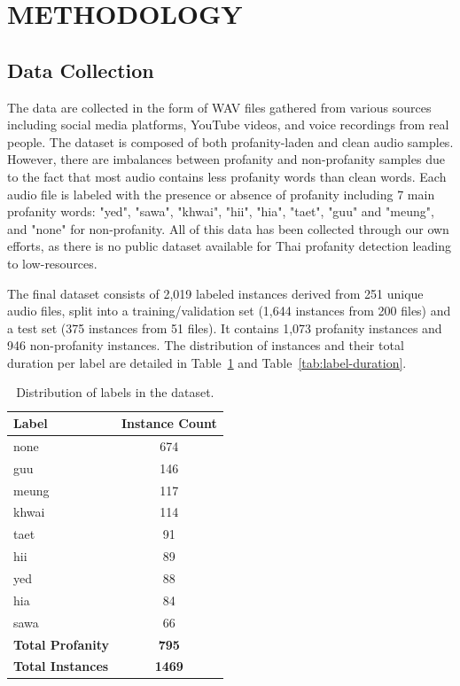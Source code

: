 \documentclass[11pt]{article}
\begin{document}
\section{METHODOLOGY}
\subsection{Data Collection}
The data are collected in the form of WAV files gathered from various sources including 
social media platforms, YouTube videos, and voice recordings from real people.
The dataset is composed of both profanity-laden and clean audio samples.
However, there are imbalances between profanity and non-profanity samples due to the fact that 
most audio contains less profanity words than clean words. 
Each audio file is labeled with the presence or absence of profanity
including 7 main profanity words: "yed", "sawa", "khwai", "hii", 
"hia", "taet", "guu" and "meung", and "none" for non-profanity. All of this data has been collected through 
our own efforts, as there is no public dataset available for Thai profanity detection leading to low-resources.

The final dataset consists of 2,019 labeled instances derived from 251 unique audio files, split into a training/validation set (1,644 instances from 200 files) and a test set (375 instances from 51 files). It contains 1,073 profanity instances and 946 non-profanity instances. The distribution of instances and their total duration per label are detailed in Table~\ref{tab:label-distribution} and Table~\ref{tab:label-duration}.

\begin{table}[H]
    \caption{Distribution of labels in the dataset.}
    \centering
    \label{tab:label-distribution}
    \begin{tabular}{|l|c|}
        \hline
        \textbf{Label} & \textbf{Instance Count} \\
        \hline
        none & 674 \\
        guu & 146 \\
        meung & 117 \\
        khwai & 114 \\
        taet & 91 \\
        hii & 89 \\
        yed & 88 \\
        hia & 84 \\
        sawa & 66 \\
        \hline
        \textbf{Total Profanity} & \textbf{795} \\
        \textbf{Total Instances} & \textbf{1469} \\
        \hline
    \end{tabular}
\end{table}
\end{document}

